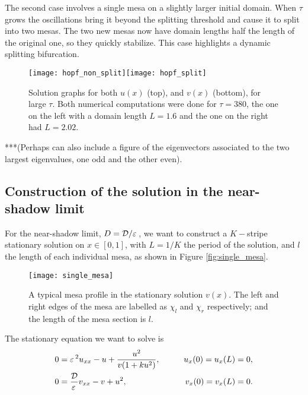 The second case involves a single mesa on a slightly larger initial domain. When $\tau$ grows the oscillations bring it beyond the splitting threshold and cause it to split into two mesas. The two new mesas now have domain lengths half the length of the original one, so they quickly stabilize. This case highlights a dynamic splitting bifurcation.
% 
\begin{figure}[htb]
\begin{center}
\texttt{[image: hopf\_non\_split]}\texttt{[image: hopf\_split]}
\caption{Solution graphs for both $u(x)$ (top), and $v(x)$ (bottom), for large $\tau$. Both numerical computations were done for $\tau=380$, the one on the left with a domain length $L=1.6$ and the one on the right had $L=2.02$.}
\label{fig:hopf}
\end{center}
\end{figure}
% 

***(Perhaps can also include a figure of the eigenvectors associated to the two largest eigenvalues, one odd and the other even).

\subsection{Construction of the solution in the near-shadow limit}

For the near-shadow limit, $D=\mathcal{D}/\varepsilon\,$, we want to construct a $K-$stripe stationary solution on $x\in[0,1]$, with $L=1/K$ the period of the solution, and $l$ the length of each individual mesa, as shown in Figure \eqref{fig:single_mesa}.
% 
\begin{figure}[htb]
\begin{center}
\texttt{[image: single\_mesa]}
\caption{A typical mesa profile in the stationary solution $v(x)$. The left and right edges of the mesa are labelled as $\chi_l$ and $\chi_r$ respectively; and the length of the mesa section is $l$.}
\label{fig:single_mesa}
\end{center}
\end{figure}
% 
The stationary equation we want to solve is
% 
\begin{equation}
\label{eqn:o-gms_stat}
\begin{split}
\begin{aligned}
	0 &= \varepsilon\,^2 u_{xx} -u + \frac{u^2}{v(1+ku^2)},\qquad &u_x(0)=u_x(L)=0, \\
	0 &= \frac{\mathcal{D}}{\varepsilon\,}v_{xx} - v + u^2,\qquad &v_x(0)=v_x(L)=0.
\end{aligned}
\end{split}
\end{equation}
% 

